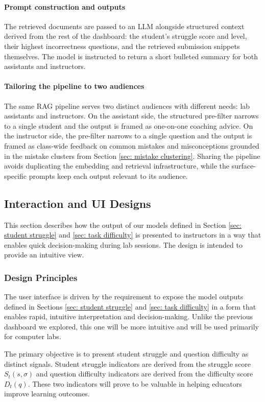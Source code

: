 \paragraph{Prompt construction and outputs}
The retrieved documents are passed to an LLM alongside structured context derived from the rest of the dashboard: the student's struggle score and level, their highest incorrectness questions, and the retrieved submission snippets themselves. The model is instructed to return a short bulleted summary for both assistants and instructors.

\paragraph{Tailoring the pipeline to two audiences}
The same RAG pipeline serves two distinct audiences with different needs: lab assistants and instructors. 
On the assistant side, the structured pre-filter narrows to a single student and the output is framed as one-on-one coaching advice.
On the instructor side, the pre-filter narrows to a single question and the output is framed as class-wide feedback on common mistakes and misconceptions grounded in the mistake clusters from Section \ref{sec: mistake clustering}. 
Sharing the pipeline avoids duplicating the embedding and retrieval infrastructure, while the surface-specific prompts keep each output relevant to its audience.

\subsection{Interaction and UI Designs}
This section describes how the output of our models defined in Section \ref{sec: student struggle} and \ref{sec: task difficulty} is presented to instructors in a way that enables quick decision-making during lab sessions. The design is intended to provide an intuitive view.

\subsubsection{Design Principles}
The user interface is driven by the requirement to expose the model outputs defined in Sections \ref{sec: student struggle} and \ref{sec: task difficulty} in a form that enables rapid, intuitive interpretation and decision-making. Unlike the previous dashboard we explored, this one will be more intuitive and will be used primarily for computer labs.

The primary objective is to present student struggle and question difficulty as distinct signals. Student struggle indicators are derived from the struggle score $S_t(s,\sigma)$ and question difficulty indicators are derived from the difficulty score $D_t(q)$. These two indicators will prove to be valuable in helping educators improve learning outcomes.

